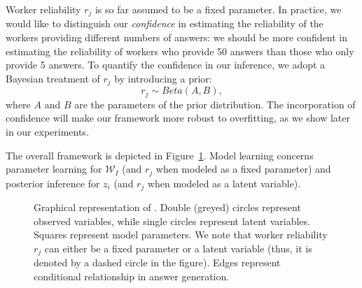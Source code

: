 Worker reliability $r_j$ is so far assumed to be a fixed parameter. In practice, we would like to distinguish our \emph{confidence} in estimating the reliability of the workers providing different numbers of answers: we should be more confident in estimating the reliability of workers who provide 50 answers than those who only provide 5 answers. To quantify the confidence in our inference, we adopt a Bayesian treatment of $r_j$ by introducing a prior:
%
\begin{equation}
        r_j \sim Beta(A,B),
        \label{eq:rj_dist}
\end{equation}
%
where $A$ and $B$ are the parameters of the prior distribution. The incorporation of confidence will make our framework more robust to overfitting, as we show later in our experiments. 

The overall \sys framework is depicted in Figure~\ref{fig:graphical_model}. Model learning concerns parameter learning for $\mathcal{W}_I$ (and $r_j$ when modeled as a fixed parameter) and posterior inference for $z_i$ (and $r_j$ when modeled as a latent variable).  

\begin{figure}[htb] 
{
}
\caption{Graphical representation of \sys. Double (greyed) circles represent observed variables, while single circles represent latent variables.  Squares represent model parameters. We note that worker reliability $r_j$ can either be a fixed parameter or a latent variable (thus, it is denoted by a dashed circle in the figure). Edges represent conditional relationship in answer generation.}
\label{fig:graphical_model}
\end{figure}


